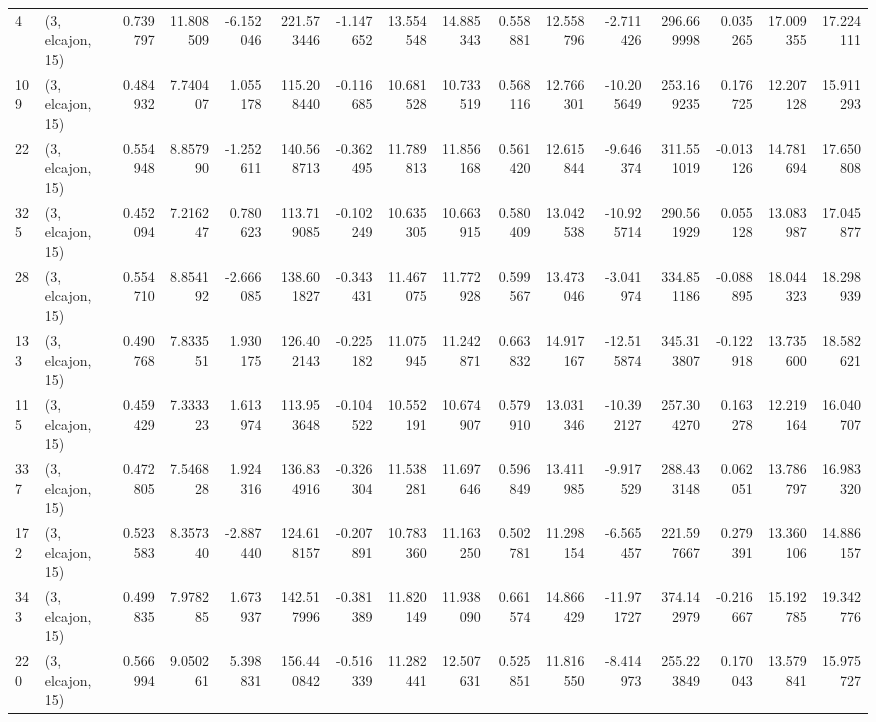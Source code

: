 \begin{tabular}{llrrrrrrrrrrrrrr}
4   &  (3, elcajon, 15) &   0.739797 &  11.808509 &  -6.152046 &   221.573446 &  -1.147652 &  13.554548 &  14.885343 &  0.558881 &  12.558796 &  -2.711426 &   296.669998 &   0.035265 &  17.009355 &  17.224111 \\
109 &  (3, elcajon, 15) &   0.484932 &   7.740407 &   1.055178 &   115.208440 &  -0.116685 &  10.681528 &  10.733519 &  0.568116 &  12.766301 & -10.205649 &   253.169235 &   0.176725 &  12.207128 &  15.911293 \\
22  &  (3, elcajon, 15) &   0.554948 &   8.857990 &  -1.252611 &   140.568713 &  -0.362495 &  11.789813 &  11.856168 &  0.561420 &  12.615844 &  -9.646374 &   311.551019 &  -0.013126 &  14.781694 &  17.650808 \\
325 &  (3, elcajon, 15) &   0.452094 &   7.216247 &   0.780623 &   113.719085 &  -0.102249 &  10.635305 &  10.663915 &  0.580409 &  13.042538 & -10.925714 &   290.561929 &   0.055128 &  13.083987 &  17.045877 \\
28  &  (3, elcajon, 15) &   0.554710 &   8.854192 &  -2.666085 &   138.601827 &  -0.343431 &  11.467075 &  11.772928 &  0.599567 &  13.473046 &  -3.041974 &   334.851186 &  -0.088895 &  18.044323 &  18.298939 \\
133 &  (3, elcajon, 15) &   0.490768 &   7.833551 &   1.930175 &   126.402143 &  -0.225182 &  11.075945 &  11.242871 &  0.663832 &  14.917167 & -12.515874 &   345.313807 &  -0.122918 &  13.735600 &  18.582621 \\
115 &  (3, elcajon, 15) &   0.459429 &   7.333323 &   1.613974 &   113.953648 &  -0.104522 &  10.552191 &  10.674907 &  0.579910 &  13.031346 & -10.392127 &   257.304270 &   0.163278 &  12.219164 &  16.040707 \\
337 &  (3, elcajon, 15) &   0.472805 &   7.546828 &   1.924316 &   136.834916 &  -0.326304 &  11.538281 &  11.697646 &  0.596849 &  13.411985 &  -9.917529 &   288.433148 &   0.062051 &  13.786797 &  16.983320 \\
172 &  (3, elcajon, 15) &   0.523583 &   8.357340 &  -2.887440 &   124.618157 &  -0.207891 &  10.783360 &  11.163250 &  0.502781 &  11.298154 &  -6.565457 &   221.597667 &   0.279391 &  13.360106 &  14.886157 \\
343 &  (3, elcajon, 15) &   0.499835 &   7.978285 &   1.673937 &   142.517996 &  -0.381389 &  11.820149 &  11.938090 &  0.661574 &  14.866429 & -11.971727 &   374.142979 &  -0.216667 &  15.192785 &  19.342776 \\
220 &  (3, elcajon, 15) &   0.566994 &   9.050261 &   5.398831 &   156.440842 &  -0.516339 &  11.282441 &  12.507631 &  0.525851 &  11.816550 &  -8.414973 &   255.223849 &   0.170043 &  13.579841 &  15.975727 \\

\end{tabular}
